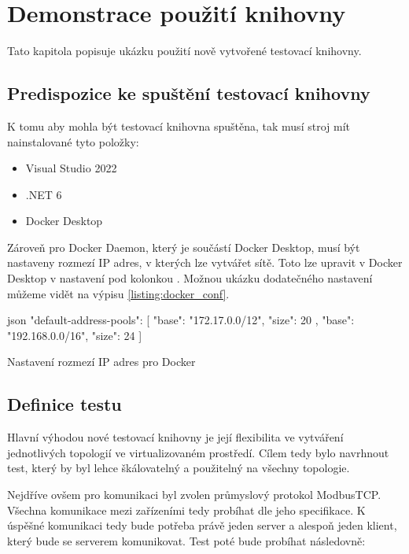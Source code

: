 \chapter{Demonstrace použití knihovny}\label{chap:demonstration}

Tato kapitola popisuje ukázku použití nově vytvořené testovací knihovny.


\section{Predispozice ke spuštění testovací knihovny}\label{sec:test_requirements}

K tomu aby mohla být testovací knihovna spuštěna, tak musí stroj mít nainstalované tyto položky:

\begin{itemize}
    \item Visual Studio 2022
    \item .NET 6
    \item Docker Desktop
\end{itemize}

Zároveň pro Docker Daemon, který je součástí Docker Desktop, musí být nastaveny rozmezí IP adres, v kterých lze vytvářet sítě. Toto lze upravit v Docker Desktop v nastavení pod kolonkou . Možnou ukázku dodatečného nastavení můžeme vidět na výpisu \ref{listing:docker_conf}. 

\begin{listing}[htbp]
    \centering
    \begin{cminted}{json}
"default-address-pools": [
    {
      "base": "172.17.0.0/12",
      "size": 20
    },
    {
      "base": "192.168.0.0/16",
      "size": 24
    }
]
    \end{cminted}
\caption{Nastavení rozmezí IP adres pro Docker}
\label{listing:docker_conf}
\end{listing}


\section{Definice testu}\label{sec:modbus_test}

Hlavní výhodou nové testovací knihovny je její flexibilita ve vytváření jednotlivých topologií ve virtualizovaném prostředí. Cílem tedy bylo navrhnout test, který by byl lehce škálovatelný a použitelný na všechny topologie. 

Nejdříve ovšem pro komunikaci byl zvolen průmyslový protokol ModbusTCP.  Všechna komunikace mezi zařízeními tedy probíhat dle jeho specifikace. K úspěšné komunikaci tedy bude potřeba právě jeden server a alespoň jeden klient, který bude se serverem komunikovat. Test poté bude probíhat následovně:

